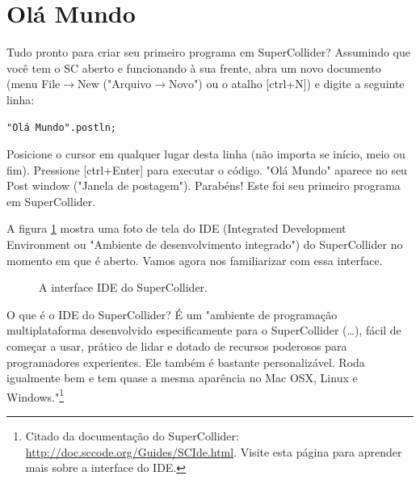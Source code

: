 
\section{Olá Mundo}

Tudo pronto para criar seu primeiro programa em SuperCollider? Assumindo que você tem o SC aberto e funcionando à sua frente, abra um novo documento (menu File$\rightarrow$New ("Arquivo$\rightarrow$Novo") ou o atalho [ctrl+N]) e digite a seguinte linha:

 
\begin{lstlisting}[style=SuperCollider-IDE, basicstyle=\scttfamily\footnotesize ]
"Olá Mundo".postln;
\end{lstlisting}
 
Posicione o cursor em qualquer lugar desta linha (não importa se início, meio ou fim). Pressione [ctrl+Enter] para executar o código. "Olá Mundo" aparece no seu Post window ("Janela de postagem"). Parabéns! Este foi seu primeiro programa em SuperCollider.

 
\bigskip
{}
\bigskip
 

A figura \ref{fig:scidegui} mostra uma foto de tela do IDE (Integrated Development Environment ou "Ambiente de desenvolvimento integrado") do SuperCollider no momento em que é aberto. Vamos agora nos familiarizar com essa interface.

\begin{figure}[t]
\centerline{}
\caption{A interface IDE do SuperCollider.}
\label{fig:scidegui}
\end{figure}

O que é o IDE do SuperCollider? É um "ambiente de programação multiplataforma desenvolvido especificamente para o SuperCollider (\dots), 
fácil de começar a usar, prático de lidar e dotado de recursos poderosos para programadores experientes. Ele também é bastante personalizável. Roda igualmente bem e tem quase a mesma aparência no 
Mac OSX, Linux e Windows."\footnote{Citado da documentação do SuperCollider: \url{http://doc.sccode.org/Guides/SCIde.html}. Visite esta página para aprender mais sobre a interface do IDE.}

